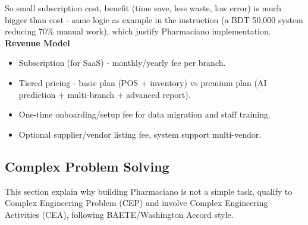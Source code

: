 So small subscription cost, benefit (time save, less waste, low error) is much bigger than cost - same logic as example in the instruction (a BDT 50,000 system reducing 70\% manual work), which justify Pharmaciano implementation.\\

\textbf{Revenue Model}
\begin{itemize}
  \item Subscription (for SaaS) - monthly/yearly fee per branch.
  \item Tiered pricing - basic plan (POS + inventory) vs premium plan (AI prediction + multi-branch + advanced report).
  \item One-time onboarding/setup fee for data migration and staff training.
  \item Optional supplier/vendor listing fee, system support multi-vendor.
\end{itemize}


\subsection{Complex Problem Solving} 
This section explain why building Pharmaciano is not a simple task, qualify to Complex Engineering Problem (CEP) and involve Complex Engineering Activities (CEA), following BAETE/Washington Accord style.
\\
